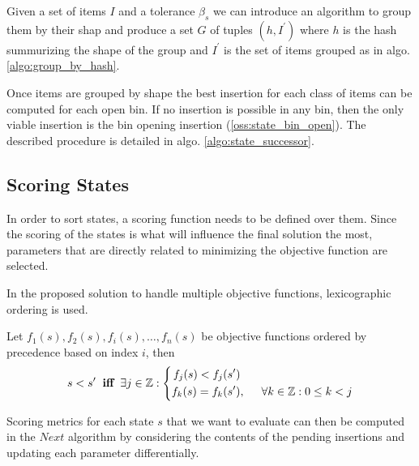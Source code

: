 Given a set of items $I$ and a tolerance $\beta_s$ we can introduce an algorithm to group them by their shap and produce a set $G$ of tuples $(h, I^\prime)$ where $h$ is the hash summurizing the shape of the group and $I^\prime$ is the set of items grouped as in algo. \ref{algo:group_by_hash}.

Once items are grouped by shape the best insertion for each class of items can be computed for each open bin. If no insertion is possible in any bin, then the only viable insertion is the bin opening insertion (\cref{oss:state_bin_open}).
The described procedure is detailed in algo. \ref{algo:state_successor}.





\subsection{Scoring States}
\label{ssec:scoring_states}%
In order to sort states, a scoring function needs to be defined over them.
Since the scoring of the states is what will influence the final solution the most, parameters that are directly related to minimizing the objective function are selected.

In the proposed solution to handle multiple objective functions, lexicographic ordering is used.
\begin{definition}
    \label{def:lexicographic_ordering}
    Let $f_1(s), f_2(s), f_i(s), \dots, f_n(s)$ be objective functions ordered by precedence based on index $i$, then 
    \begin{equation*}
        s < s^\prime \hspace{.2cm} \textbf{iff} \hspace{.2cm} \exists j \in \mathbb{Z} : \left\{
            \begin{aligned}
                f_j(s) < f_j(s^\prime) & \\
                f_k(s) = f_k(s^\prime) &,\hspace{.5cm} \forall k \in \mathbb{Z} : 0 \le k < j 
            \end{aligned}
        \right.
    \end{equation*}
\end{definition}

Scoring metrics for each state $s$ that we want to evaluate can then be computed in the $Next$ algorithm by considering the contents of the pending insertions and updating each parameter differentially.

